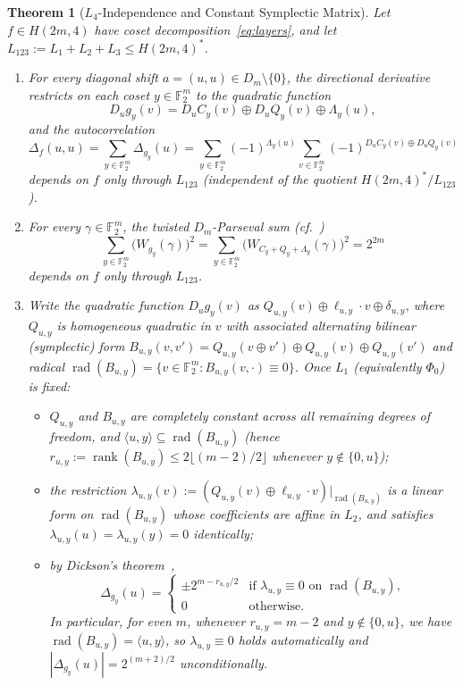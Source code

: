 \documentclass[11pt,a4paper]{article}
\newtheorem{theorem}{Theorem}[section]
\theoremstyle{definition}
\newcommand{\F}{\mathbb{F}_2}
\newcommand{\rk}{\operatorname{rank}}
\newcommand{\rad}{\operatorname{rad}}
\begin{document}
\begin{theorem}[$L_4$-Independence and Constant Symplectic Matrix]
\label{thm:l4_dickson}
Let $f \in H(2m,4)$ have coset decomposition~\eqref{eq:layers}, and let $L_{123} := L_1 + L_2 + L_3 \le H(2m,4)^*$.
\begin{enumerate}
  \item For every diagonal shift $a = (u, u) \in D_m \setminus \{0\}$, the directional derivative restricts on each coset $y \in \F^m$ to the quadratic function
  \[
    D_u g_y(v) = D_u C_y(v) \oplus D_u Q_y(v) \oplus \Lambda_y(u),
  \]
  and the autocorrelation
  \begin{equation}
  \label{eq:diag_ac}
    \Delta_f(u, u) = \sum_{y \in \F^m} \Delta_{g_y}(u) = \sum_{y \in \F^m} (-1)^{\Lambda_y(u)} \sum_{v \in \F^m} (-1)^{D_u C_y(v) \oplus D_u Q_y(v)}
  \end{equation}
  depends on $f$ \emph{only} through $L_{123}$ (independent of the quotient $H(2m,4)^*/L_{123}$).
  \item For every $\gamma \in \F^m$, the twisted $D_m$-Parseval sum (cf.~\cite{canteaut2003})
  \[
    \sum_{y \in \F^m} \big(W_{g_y}(\gamma)\big)^2 = \sum_{y \in \F^m} \big(W_{C_y + Q_y + \Lambda_y}(\gamma)\big)^2 = 2^{2m}
  \]
  depends on $f$ \emph{only} through $L_{123}$.
  \item Write the quadratic function $D_u g_y(v)$ as $Q_{u,y}(v) \oplus \ell_{u,y} \cdot v \oplus \delta_{u,y}$, where $Q_{u,y}$ is homogeneous quadratic in $v$ with associated alternating bilinear (symplectic) form $B_{u,y}(v,v') = Q_{u,y}(v \oplus v') \oplus Q_{u,y}(v) \oplus Q_{u,y}(v')$ and radical $\rad(B_{u,y}) = \{v \in \F^m : B_{u,y}(v,\cdot) \equiv 0\}$. Once $L_1$ (equivalently $\Phi_0$) is fixed:
  \begin{itemize}
    \item $Q_{u,y}$ and $B_{u,y}$ are completely constant across all remaining degrees of freedom, and $\langle u, y \rangle \subseteq \rad(B_{u,y})$ (hence $r_{u,y} := \rk(B_{u,y}) \le 2\lfloor(m-2)/2\rfloor$ whenever $y \notin \{0,u\}$);
    \item the restriction $\lambda_{u,y}(v) := (Q_{u,y}(v) \oplus \ell_{u,y} \cdot v)\big|_{\rad(B_{u,y})}$ is a linear form on $\rad(B_{u,y})$ whose coefficients are affine in $L_2$, and satisfies $\lambda_{u,y}(u) = \lambda_{u,y}(y) = 0$ identically;
    \item by Dickson's theorem~\cite[Ch.~15]{macwilliams_sloane},
    \[
      \Delta_{g_y}(u) = \begin{cases}
        \pm 2^{m - r_{u,y}/2} & \text{if } \lambda_{u,y} \equiv 0 \text{ on } \rad(B_{u,y}), \\
        0 & \text{otherwise.}
      \end{cases}
    \]
    In particular, for even $m$, whenever $r_{u,y} = m - 2$ and $y \notin \{0,u\}$, we have $\rad(B_{u,y}) = \langle u, y \rangle$, so $\lambda_{u,y} \equiv 0$ holds automatically and $|\Delta_{g_y}(u)| = 2^{(m+2)/2}$ unconditionally.
  \end{itemize}
\end{enumerate}
\end{theorem}
\end{document}
